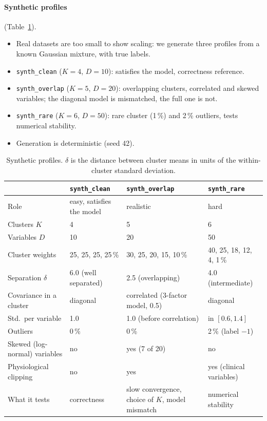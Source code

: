 \documentclass[conference,onecolumn]{IEEEtran}
\begin{document}
\paragraph{Synthetic profiles} (Table~\ref{tab:synth-profiles}).
\begin{itemize}
\item Real datasets are too small to show scaling: we generate three profiles from a known Gaussian mixture, with true labels.
\item \texttt{synth\_clean} ($K=4$, $D=10$): satisfies the model, correctness reference.
\item \texttt{synth\_overlap} ($K=5$, $D=20$): overlapping clusters, correlated and skewed variables; the diagonal model is mismatched, the full one is not.
\item \texttt{synth\_rare} ($K=6$, $D=50$): rare cluster (1\,\%) and 2\,\% outliers, tests numerical stability.
\item Generation is deterministic (seed 42).
\end{itemize}

\begin{table}[H]
\centering
\caption{Synthetic profiles. $\delta$ is the distance between cluster means in units of the within-cluster standard deviation.}
\label{tab:synth-profiles}
\footnotesize
\setlength{\tabcolsep}{3pt}
\begin{tabular}{llll}
\toprule
 & \texttt{synth\_clean} & \texttt{synth\_overlap} & \texttt{synth\_rare} \\
\midrule
Role & easy, satisfies the model & realistic & hard \\
Clusters $K$ & 4 & 5 & 6 \\
Variables $D$ & 10 & 20 & 50 \\
Cluster weights & 25, 25, 25, 25\,\% & 30, 25, 20, 15, 10\,\% & 40, 25, 18, 12, 4, 1\,\% \\
Separation $\delta$ & 6.0 (well separated) & 2.5 (overlapping) & 4.0 (intermediate) \\
Covariance in a cluster & diagonal & correlated (3-factor model, 0.5) & diagonal \\
Std.\ per variable & 1.0 & 1.0 (before correlation) & in $[0.6, 1.4]$ \\
Outliers & 0\,\% & 0\,\% & 2\,\% (label $-1$) \\
Skewed (log-normal) variables & no & yes (7 of 20) & no \\
Physiological clipping & no & yes & yes (clinical variables) \\
What it tests & correctness & slow convergence, choice of $K$, model mismatch & numerical stability \\
\bottomrule
\end{tabular}
\end{table}
\end{document}
